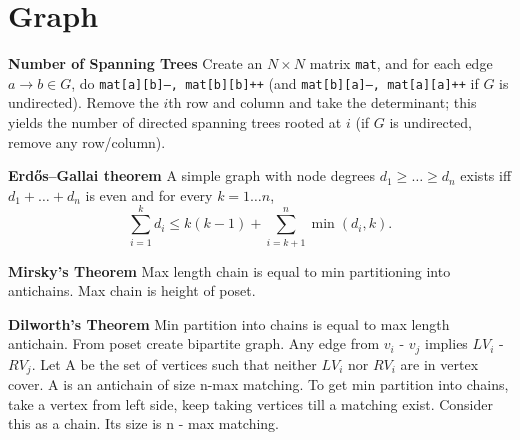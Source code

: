                 
\section{Graph}
\textbf{Number of Spanning Trees}
Create an $N\times N$ matrix \texttt{mat}, and for each edge $a \rightarrow b \in G$, do
\texttt{mat[a][b]--, mat[b][b]++} (and \texttt{mat[b][a]--, mat[a][a]++} if $G$ is undirected).
Remove the $i$th row and column and take the determinant; this yields the number of directed spanning trees rooted at $i$
(if $G$ is undirected, remove any row/column).

\textbf{Erdős–Gallai theorem}
A simple graph with node degrees $d_1 \ge \dots \ge d_n$ exists iff $d_1 + \dots + d_n$ is even and for every $k = 1\dots n$,
\[ \sum _{i=1}^{k}d_{i}\leq k(k-1)+\sum _{i=k+1}^{n}\min(d_{i},k). \]

\textbf{Mirsky's Theorem} Max length chain is equal to min partitioning into antichains. Max chain is height of poset.

\textbf{Dilworth's Theorem} Min partition into chains is equal to max length antichain. From poset create bipartite graph. Any edge from $v_{i}$ - $v_{j}$ implies  $LV_{i}$ - $RV_{j}$. Let A be the set of vertices such that neither $LV_{i}$ nor $RV_{i}$ are in vertex cover. A is an antichain of size n-max matching. To get min partition into chains, take a vertex from left side, keep taking vertices till a matching exist. Consider this as a chain. Its size is n - max matching.
        
